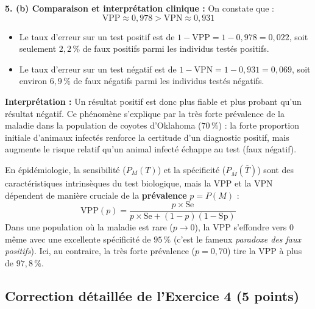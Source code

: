 \documentclass[11pt,a4paper]{article}
\begin{document}
\begin{correctionbox}
\textbf{5. (b) Comparaison et interprétation clinique :}
On constate que :
\[
\mathrm{VPP} \approx 0{,}978 > \mathrm{VPN} \approx 0{,}931
\]
\begin{itemize}[label=$\bullet$]
    \item Le taux d'erreur sur un test positif est de $1 - \mathrm{VPP} = 1 - 0{,}978 = 0{,}022$, soit seulement \textbf{$2{,}2\,\%$} de faux positifs parmi les individus testés positifs.
    \item Le taux d'erreur sur un test négatif est de $1 - \mathrm{VPN} = 1 - 0{,}931 = 0{,}069$, soit environ \textbf{$6{,}9\,\%$} de faux négatifs parmi les individus testés négatifs.
\end{itemize}
\textbf{Interprétation :} Un résultat positif est donc plus fiable et plus probant qu'un résultat négatif. Ce phénomène s'explique par la très forte prévalence de la maladie dans la population de coyotes d'Oklahoma ($70\,\%$) : la forte proportion initiale d'animaux infectés renforce la certitude d'un diagnostic positif, mais augmente le risque relatif qu'un animal infecté échappe au test (faux négatif).
\end{correctionbox}

\begin{alertebox}
En épidémiologie, la sensibilité ($P_M(T)$) et la spécificité ($P_{\overline{M}}(\overline{T})$) sont des caractéristiques intrinsèques du test biologique, mais la $\mathrm{VPP}$ et la $\mathrm{VPN}$ dépendent de manière cruciale de la \textbf{prévalence} $p = P(M)$ :
\[
\mathrm{VPP}(p) = \frac{p \times \mathrm{Se}}{p \times \mathrm{Se} + (1-p)(1-\mathrm{Sp})}
\]
Dans une population où la maladie est rare ($p \to 0$), la $\mathrm{VPP}$ s'effondre vers $0$ même avec une excellente spécificité de $95\,\%$ (c'est le fameux \emph{paradoxe des faux positifs}). Ici, au contraire, la très forte prévalence ($p = 0{,}70$) tire la $\mathrm{VPP}$ à plus de $97{,}8\,\%$.
\end{alertebox}

\vspace{0.4cm}

\subsection*{Correction détaillée de l'Exercice 4 \hfill (5 points)}
\end{document}
